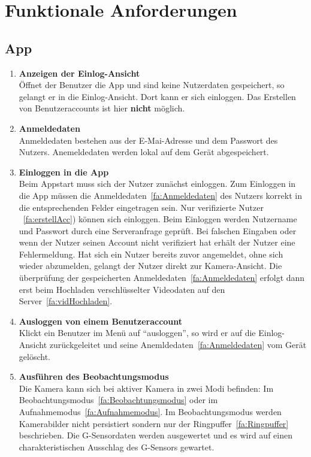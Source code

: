 \chapter{Funktionale Anforderungen}

\section{App}
\begin{enumerate}
\renewcommand{\labelenumi}{\textbf{\theenumi}}
\renewcommand{\theenumi}{FA\arabic{enumi}0}
\setcounter{enumi}{99}
\item \textbf{Anzeigen der Einlog-Ansicht} \hfill \\
Öffnet der Benutzer die App und sind keine Nutzerdaten gespeichert, so gelangt er in die Einlog-Ansicht. Dort kann er sich einloggen. Das Erstellen von Benutzeraccounts ist hier \textbf{nicht} möglich.

\item \label{fa:Anmeldedaten}\textbf{Anmeldedaten} \hfill \\
Anmeldedaten bestehen aus der E-Mai-Adresse und dem Passwort des Nutzers. Anemeldedaten werden lokal auf dem Gerät abgespeichert.

\item \textbf{Einloggen in die App} \hfill \\
Beim Appstart muss sich der Nutzer zunächst einloggen. Zum Einloggen in die App müssen die Anmeldedaten~\eqref{fa:Anmeldedaten} des Nutzers korrekt in die entsprechenden Felder eingetragen sein. Nur verifizierte Nutzer ~\eqref{fa:erstellAcc}) können sich einloggen. Beim Einloggen werden Nutzername und Passwort durch eine Serveranfrage geprüft. Bei falschen Eingaben oder wenn der Nutzer seinen Account nicht verifiziert hat erhält der Nutzer eine Fehlermeldung. Hat sich ein Nutzer bereits zuvor angemeldet, ohne sich wieder abzumelden, gelangt der Nutzer direkt zur Kamera-Ansicht. Die überprüfung der gespeicherten Anmeldedaten~\eqref{fa:Anmeldedaten} erfolgt dann erst beim Hochladen verschlüsselter Videodaten auf den Server~\eqref{fa:vidHochladen}.

\item \label{fa:logOut}\textbf{Ausloggen von einem Benutzeraccount} \hfill \\
Klickt ein Benutzer im Menü auf ``ausloggen'', so wird er auf die Einlog-Ansicht zurückgeleitet und seine Anemldedaten~\eqref{fa:Anmeldedaten} vom Gerät gelöscht.

\item \label{fa:Beobachtungsmodus}\textbf{Ausführen des Beobachtungsmodus} \hfill \\
Die Kamera kann sich bei aktiver Kamera in zwei Modi befinden: Im Beobachtungsmodus~\eqref{fa:Beobachtungsmodus} oder im Aufnahmemodus~\eqref{fa:Aufnahmemodus}.
Im Beobachtungsmodus werden Kamerabilder nicht persistiert sondern nur der Ringpuffer~\eqref{fa:Ringpuffer} beschrieben. Die G-Sensordaten werden ausgewertet und es wird auf einen charakteristischen Ausschlag des G-Sensors gewartet.


\end{enumerate}
